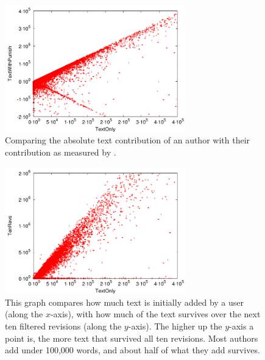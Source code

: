 \begin{figure}[t]
    \begin{center}
    \includegraphics[width=0.70\textwidth]{part-I10-contrib/graphs/score-zoom-textonly-textwithpunish}
    \end{center}
    \caption[TextOnly vs TextWithPunish]{
    	Comparing the absolute text contribution of an author with
	their contribution as measured by \punish.
    }
    \label{fig-zoom-textonly-textwithpunish}
\end{figure}
%
\begin{figure}[t]
    \begin{center}
    \includegraphics[width=0.70\textwidth]{part-I10-contrib/graphs/score-zoom-revisions-textonly}
    \end{center}
    \caption[Measuring short term text survival]{
    	This graph compares how much text is initially added
	by a user (along the $x$-axis), with how much
	of the text survives over the next ten filtered revisions
	(along the $y$-axis).
	The higher up the $y$-axis a point is, the more
	text that survived all ten revisions.
	Most authors add under 100,000 words,
	and about half of what they add survives.
    }
    \label{fig-zoom-revisions-textonly}
\end{figure}
